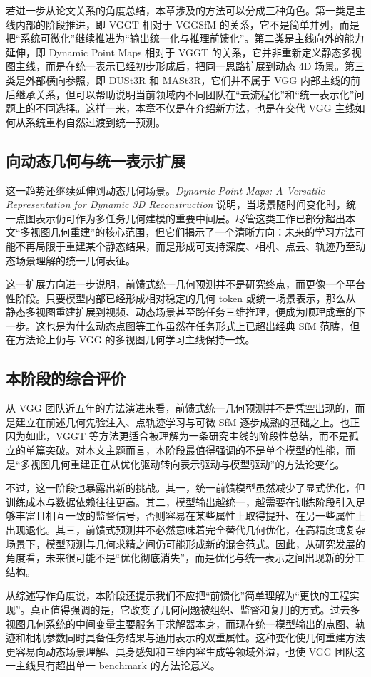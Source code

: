 若进一步从论文关系的角度总结，本章涉及的方法可以分成三种角色。第一类是主线内部的阶段推进，即 VGGT 相对于 VGGSfM 的关系，它不是简单并列，而是把“系统可微化”继续推进为“输出统一化与推理前馈化”。第二类是主线向外的能力延伸，即 Dynamic Point Maps 相对于 VGGT 的关系，它并非重新定义静态多视图主线，而是在统一表示已经初步形成后，把同一思路扩展到动态 4D 场景。第三类是外部横向参照，即 DUSt3R 和 MASt3R，它们并不属于 VGG 内部主线的前后继承关系，但可以帮助说明当前领域内不同团队在“去流程化”和“统一表示化”问题上的不同选择。这样一来，本章不仅是在介绍新方法，也是在交代 VGG 主线如何从系统重构自然过渡到统一预测。

\subsection{向动态几何与统一表示扩展}

这一趋势还继续延伸到动态几何场景。\textit{Dynamic Point Maps: A Versatile Representation for Dynamic 3D Reconstruction} 说明，当场景随时间变化时，统一点图表示仍可作为多任务几何建模的重要中间层\cite{sucar2025dpm}。尽管这类工作已部分超出本文“多视图几何重建”的核心范围，但它们揭示了一个清晰方向：未来的学习方法可能不再局限于重建某个静态结果，而是形成可支持深度、相机、点云、轨迹乃至动态场景理解的统一几何表征。

这一扩展方向进一步说明，前馈式统一几何预测并不是研究终点，而更像一个平台性阶段。只要模型内部已经形成相对稳定的几何 token 或统一场景表示，那么从静态多视图重建扩展到视频、动态场景甚至跨任务三维推理，便成为顺理成章的下一步。这也是为什么动态点图等工作虽然在任务形式上已超出经典 SfM 范畴，但在方法论上仍与 VGG 的多视图几何学习主线保持一致。

\subsection{本阶段的综合评价}

从 VGG 团队近五年的方法演进来看，前馈式统一几何预测并不是凭空出现的，而是建立在前述几何先验注入、点轨迹学习与可微 SfM 逐步成熟的基础之上。也正因为如此，VGGT 等方法更适合被理解为一条研究主线的阶段性总结，而不是孤立的单篇突破。对本文主题而言，本阶段最值得强调的不是单个模型的性能，而是“多视图几何重建正在从优化驱动转向表示驱动与模型驱动”的方法论变化。

不过，这一阶段也暴露出新的挑战。其一，统一前馈模型虽然减少了显式优化，但训练成本与数据依赖往往更高。其二，模型输出越统一，越需要在训练阶段引入足够丰富且相互一致的监督信号，否则容易在某些属性上取得提升、在另一些属性上出现退化。其三，前馈式预测并不必然意味着完全替代几何优化，在高精度或复杂场景下，模型预测与几何求精之间仍可能形成新的混合范式。因此，从研究发展的角度看，未来很可能不是“优化彻底消失”，而是优化与统一表示之间出现新的分工结构。

从综述写作角度说，本阶段还提示我们不应把“前馈化”简单理解为“更快的工程实现”。真正值得强调的是，它改变了几何问题被组织、监督和复用的方式。过去多视图几何系统的中间变量主要服务于求解器本身，而现在统一模型输出的点图、轨迹和相机参数同时具备任务结果与通用表示的双重属性。这种变化使几何重建方法更容易向动态场景理解、具身感知和三维内容生成等领域外溢，也使 VGG 团队这一主线具有超出单一 benchmark 的方法论意义。
